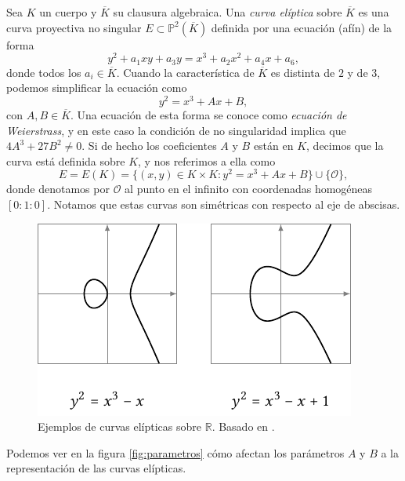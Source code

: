 \documentclass[
  a4paper,
  12pt,
  spanish,
]{scrartcl}
\begin{document}
    Sea $K$ un cuerpo y $\overline{K}$ su clausura algebraica. Una \textit{curva elíptica} sobre $\overline{K}$ es una curva proyectiva no singular $E \subset \mathbb{P}^2(\overline{K})$ definida por una ecuación (afín) de la forma \[ y^2 + a_1xy + a_3y = x^3 +a_2x^2 + a_4x + a_6, \] donde todos los $a_i \in \overline{K}$.
    Cuando la característica de $\overline{K}$ es distinta de $2$ y de $3$, podemos simplificar la ecuación como \[ y^2 = x^3 + Ax + B, \] con $A,B \in \overline{K}$. Una ecuación de esta forma se conoce como \textit{ecuación de Weierstrass}, y en este caso la condición de no singularidad implica que $4A^3 + 27B^2 \neq 0$. Si de hecho los coeficientes $A$ y $B$ están en $K$, decimos que la curva está definida sobre $K$, y nos referimos a ella como \[ E = E(K) = \{ (x, y) \in K \times K : y^2 = x^3 + Ax + B\} \cup \{\mathcal{O}\}, \] donde denotamos por $\mathcal{O}$ al punto en el infinito con coordenadas homogéneas $[0:1:0]$. Notamos que estas curvas son simétricas con respecto al eje de abscisas.
    
\begin{figure}[h]
  \centering
  \includegraphics[width=.75\textwidth]{img/ejemplos-curvas}
  \caption{Ejemplos de curvas elípticas sobre $\mathbb{R}$. Basado en \parencite{eichlseder_elliptic_2016}.}
  \label{fig:curva}
\end{figure}

Podemos ver en la figura \ref{fig:parametros} cómo afectan los parámetros $A$ y $B$ a la representación de las curvas elípticas.
\end{document}
